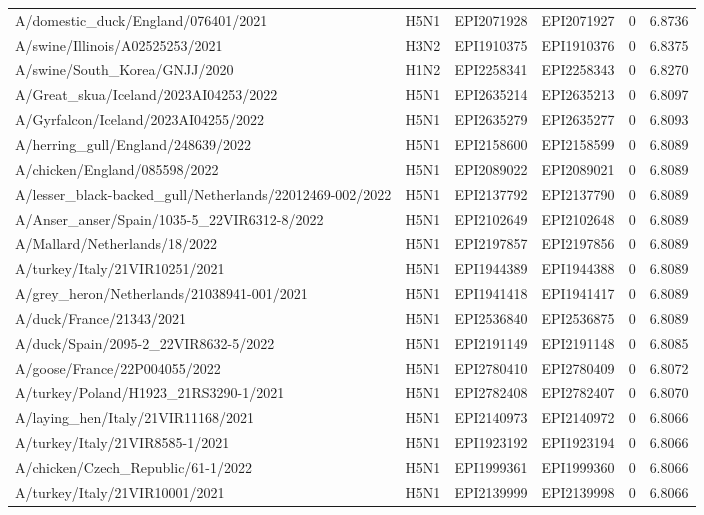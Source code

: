 \begin{tabular}{L{1.95in}|L{.25in}|L{.60in}|L{.6in}|C{1in}|C{1in}}
A/domestic\_duck/England/076401/2021&H5N1&EPI2071928&EPI2071927&0&6.8736\\
A/swine/Illinois/A02525253/2021&H3N2&EPI1910375&EPI1910376&0&6.8375\\
A/swine/South\_Korea/GNJJ/2020&H1N2&EPI2258341&EPI2258343&0&6.8270\\
A/Great\_skua/Iceland/2023AI04253/2022&H5N1&EPI2635214&EPI2635213&0&6.8097\\
A/Gyrfalcon/Iceland/2023AI04255/2022&H5N1&EPI2635279&EPI2635277&0&6.8093\\
A/herring\_gull/England/248639/2022&H5N1&EPI2158600&EPI2158599&0&6.8089\\
A/chicken/England/085598/2022&H5N1&EPI2089022&EPI2089021&0&6.8089\\
A/lesser\_black-backed\_gull/Netherlands/22012469-002/2022&H5N1&EPI2137792&EPI2137790&0&6.8089\\
A/Anser\_anser/Spain/1035-5\_22VIR6312-8/2022&H5N1&EPI2102649&EPI2102648&0&6.8089\\
A/Mallard/Netherlands/18/2022&H5N1&EPI2197857&EPI2197856&0&6.8089\\
A/turkey/Italy/21VIR10251/2021&H5N1&EPI1944389&EPI1944388&0&6.8089\\
A/grey\_heron/Netherlands/21038941-001/2021&H5N1&EPI1941418&EPI1941417&0&6.8089\\
A/duck/France/21343/2021&H5N1&EPI2536840&EPI2536875&0&6.8089\\
A/duck/Spain/2095-2\_22VIR8632-5/2022&H5N1&EPI2191149&EPI2191148&0&6.8085\\
A/goose/France/22P004055/2022&H5N1&EPI2780410&EPI2780409&0&6.8072\\
A/turkey/Poland/H1923\_21RS3290-1/2021&H5N1&EPI2782408&EPI2782407&0&6.8070\\
A/laying\_hen/Italy/21VIR11168/2021&H5N1&EPI2140973&EPI2140972&0&6.8066\\
A/turkey/Italy/21VIR8585-1/2021&H5N1&EPI1923192&EPI1923194&0&6.8066\\
A/chicken/Czech\_Republic/61-1/2022&H5N1&EPI1999361&EPI1999360&0&6.8066\\
A/turkey/Italy/21VIR10001/2021&H5N1&EPI2139999&EPI2139998&0&6.8066\\

\end{tabular}
